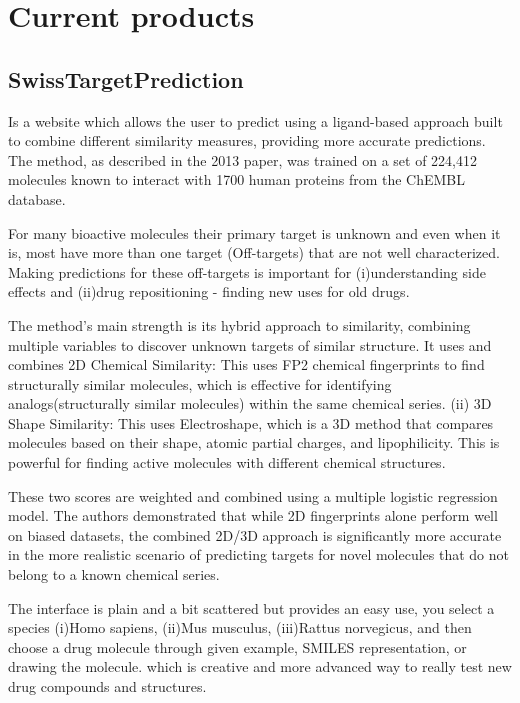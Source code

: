 \section{Current products}

\subsection{SwissTargetPrediction} \citep{Gfeller2013} \citep{STP_web} Is a website which allows the user to predict using a ligand-based approach built to combine different similarity measures, providing more accurate predictions. The method, as described in the 2013 paper, was trained on a set of 224,412 molecules known to interact with 1700 human proteins from the ChEMBL database.

For many bioactive molecules their primary target is unknown and even when it is, most have more than one target (Off-targets) that are not well characterized. Making predictions for these off-targets is important for (i)understanding side effects and (ii)drug repositioning - finding new uses for old drugs.

The method's main strength is its hybrid approach to similarity, combining multiple variables to discover unknown targets of similar structure. It uses and combines 2D Chemical Similarity: This uses FP2 chemical fingerprints to find structurally similar molecules, which is effective for identifying analogs(structurally similar molecules) within the same chemical series. (ii) 3D Shape Similarity: This uses Electroshape, which is a 3D method that compares molecules based on their shape, atomic partial charges, and lipophilicity. This is powerful for finding active molecules with different chemical structures.

These two scores are weighted and combined using a multiple logistic regression model. The authors demonstrated that while 2D fingerprints alone perform well on biased datasets, the combined 2D/3D approach is significantly more accurate in the more realistic scenario of predicting targets for novel molecules that do not belong to a known chemical series.

The interface is plain and a bit scattered but provides an easy use, you select a species (i)Homo sapiens, (ii)Mus musculus, (iii)Rattus norvegicus, and then choose a drug molecule through given example, SMILES representation, or drawing the molecule. which is creative and more advanced way to really test new drug compounds and structures. 



